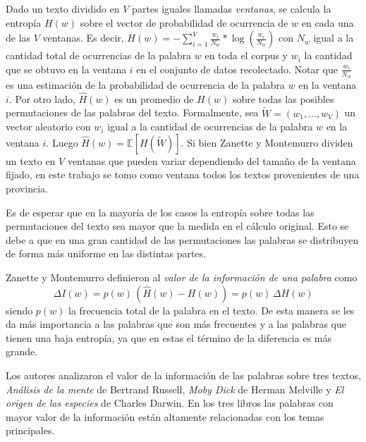 Dado un texto dividido en $V$ partes iguales llamadas \textit{ventanas}, se calcula la entropía  $H(w)$ sobre el vector de probabilidad de ocurrencia de $w$ en cada una de las $V$ ventanas.  Es decir, $H(w) = -\sum\limits_{i=1}^{V} \frac{w_i}{N_w} * \log(\frac{w_i}{N_w})$ con $N_w$ igual a la cantidad total de ocurrencias de la palabra $w$ en toda el corpus y $w_i$ la cantidad que se obtuvo en la ventana $i$ en el conjunto de datos recolectado. Notar que $\frac{w_i}{N_w}$ es una estimación de la probabilidad de ocurrencia de la palabra $w$ en la ventana $i$. Por otro lado, $\widehat{H}(w)$ es un promedio de $H(w)$ sobre todas las posibles permutaciones de las palabras del texto. Formalmente, sea $\widetilde{W} = (w_{1},\dots,w_{V})$ un vector aleatorio con $w_{i}$ igual a la cantidad de ocurrencias de la palabra $w$ en la ventana $i$. Luego $\widehat{H}(w) = \mathbb{E}[H(\widetilde{W})]$.
Si bien Zanette y Montemurro dividen un texto en $V$ ventanas que pueden variar dependiendo del tamaño de la ventana fijado, en este trabajo se tomo como ventana todos los textos provenientes de una provincia.


Es de esperar que en la mayoría de los casos 
la entropía sobre todas las permutaciones del texto sea mayor que la medida en el cálculo original. Esto 
se debe a que en una gran cantidad de las permutaciones las palabras se distribuyen de forma más uniforme 
en las distintas partes.

Zanette y Montemurro definieron al \textit{valor de la información de una palabra} como
 \begin{equation}
  \Delta I(w) = p(w) \,  (\widehat{H}(w) - H(w))  =  p(w) \, \Delta{H(w)}
 \end{equation}
siendo $p(w)$ la frecuencia total de la palabra en el texto.
De esta manera se les da más importancia a las palabras que son más frecuentes y a las palabras que tienen una baja entropía, ya que en estas el término de la diferencia es más grande.

Los autores analizaron el valor de la información de las palabras sobre tres textos, \textit{Análisis de la mente} de Bertrand Russell, 
\textit{Moby Dick} de Herman Melville y \textit{El origen de las especies} de Charles Darwin. 
En los tres libros las palabras con mayor valor de la información están 
altamente relacionadas con los temas principales. 


